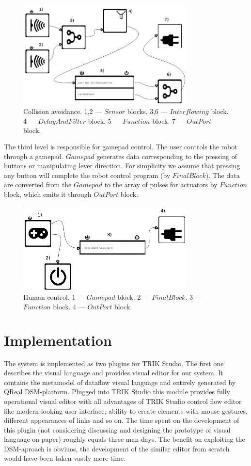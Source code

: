 \documentclass[conference,compsoc]{IEEEtran}
\begin{document}
\begin{figure}[ht]
	\centering
	\includegraphics[width=3.5in]{2l.png}
	\caption{Collision avoidance. 1,2 --- $Sensor$ blocks. 3,6 --- $Interflowing$ block. 4 --- $DelayAndFilter$ block. 5 --- $Function$ block. 7 --- $OutPort$ block.}
	\label{image:2l}
\end{figure}

The third level is responsible for gamepad control. The user controls the robot through a gamepad. $Gamepad$ generates data corresponding to the pressing of buttons or manipulating lever direction. For simplicity we assume that pressing any button will complete the robot control program (by $FinalBlock$). The data are converted from the $Gamepad$ to the array of pulses for actuators by $Function$ block, which emits it through $OutPort$ block.

\begin{figure}[ht]
	\centering
	\includegraphics[width=3.5in]{3l.png}
	\caption{Human control. 1 --- $Gamepad$ block. 2 --- $FinalBlock$. 3 --- $Function$ block. 4 --- $OutPort$ block.}
	\label{image:3l}
\end{figure}


\section{Implementation}
\label{sec:Implementation}
The system is implemented as two plugins for TRIK Studio. The first one describes the visual language and provides visual editor for our system. It contains the metamodel of dataflow visual language and entirely generated by QReal DSM-platform. Plugged into TRIK Studio this module provides fully operational visual editor with all advantages of TRIK Studio control flow editor like modern-looking user interface, ability to create elements with mouse gestures, different appearances of links and so on. The time spent on the development of this plugin (not considering discussing and designing the prototype of visual language on paper) roughly equals three man-days. The benefit on exploiting the DSM-aproach is obviuos, the development of the similar editor from scratch would have been taken vastly more time.
\end{document}
